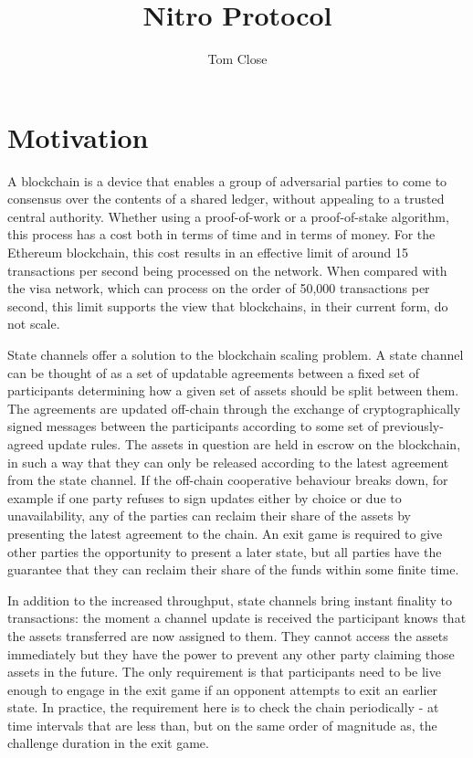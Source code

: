 \documentclass{article}
\title{Nitro Protocol}
\author{Tom Close}
\theoremstyle{definition}
\begin{document}
\maketitle

\section{Motivation}

A blockchain is a device that enables a group of adversarial parties to come to consensus over the contents of a shared ledger, without appealing to a trusted central authority. 
Whether using a proof-of-work or a proof-of-stake algorithm, this process has a cost both in terms of time and in terms of money.
For the Ethereum blockchain, this cost results in an effective limit of around 15 transactions per second being processed on the network.
When compared with the visa network, which can process on the order of 50,000 transactions per second, this limit supports the view that blockchains, in their current form, do not scale.

State channels offer a solution to the blockchain scaling problem.
A state channel can be thought of as a set of updatable agreements between a fixed set of participants determining how a given set of assets should be split between them.
The agreements are updated off-chain through the exchange of cryptographically signed messages between the participants according to some set of previously-agreed update rules. 
The assets in question are held in escrow on the blockchain, in such a way
that they can only be released according to the latest agreement from the state channel.
If the off-chain cooperative behaviour breaks down, for example if one party refuses to sign updates either by choice or due to unavailability, any of the parties can reclaim their share of the assets by presenting the latest agreement to the chain.
An exit game is required to give other parties the opportunity to present a later state, but all parties have the guarantee that they can reclaim their share of the funds within some finite time.

In addition to the increased throughput, state channels bring instant finality to transactions: the moment a channel update is received the participant knows that the assets transferred are now assigned to them.
They cannot access the assets immediately but they have the power to prevent any other party claiming those assets in the future.
The only requirement is that participants need to be live enough to engage in the exit game if an opponent attempts to exit an earlier state.
In practice, the requirement here is to check the chain periodically - at time intervals that are less than, but on the same order of magnitude as, the challenge duration in the exit game.
\end{document}
